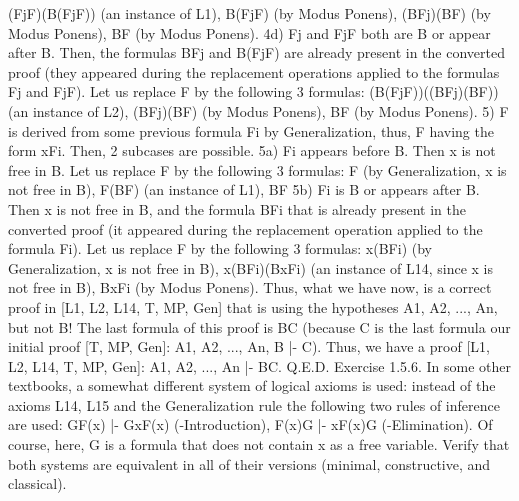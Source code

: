 (Fj\IMPLIES F)\IMPLIES (B\IMPLIES (Fj\IMPLIES F)) (an instance of L1),
B\IMPLIES (Fj\IMPLIES F) (by Modus Ponens),
(B\IMPLIES Fj)\IMPLIES (B\IMPLIES F) (by Modus Ponens),
B\IMPLIES F (by Modus Ponens).
4d) Fj and Fj\IMPLIES F both are B or appear after B. Then, the formulas B\IMPLIES Fj and B\IMPLIES (Fj\IMPLIES F) are already
present in the converted proof (they appeared during the replacement operations applied to the formulas
Fj and Fj\IMPLIES F). Let us replace F by the following 3 formulas:
(B\IMPLIES (Fj\IMPLIES F))\IMPLIES ((B\IMPLIES Fj)\IMPLIES (B\IMPLIES F)) (an instance of L2),
(B\IMPLIES Fj)\IMPLIES (B\IMPLIES F) (by Modus Ponens),
B\IMPLIES F (by Modus Ponens).
5) F is derived from some previous formula Fi by Generalization, thus, F having the form \forall xFi. Then, 2
subcases are possible.
5a) Fi appears before B. Then x is not free in B. Let us replace F by the following 3 formulas:
F (by Generalization, x is not free in B),
F\IMPLIES (B\IMPLIES F) (an instance of L1),
B\IMPLIES F
5b) Fi is B or appears after B. Then x is not free in B, and the formula B\IMPLIES Fi that is already present in the
converted proof (it appeared during the replacement operation applied to the formula Fi). Let us replace F
by the following 3 formulas:
\forall x(B\IMPLIES Fi) (by Generalization, x is not free in B),
\forall x(B\IMPLIES Fi)\IMPLIES (B\IMPLIES \forall xFi) (an instance of L14, since x is not free in B),
B\IMPLIES \forall xFi (by Modus Ponens).
Thus, what we have now, is a correct proof in [L1, L2, L14, T, MP, Gen] that is using the hypotheses A1,
A2, ..., An, but not B! The last formula of this proof is B\IMPLIES C (because C is the last formula our initial
proof [T, MP, Gen]: A1, A2, ..., An, B |- C). Thus, we have a proof [L1, L2, L14, T, MP, Gen]: A1, A2, ...,
An |- B\IMPLIES C. Q.E.D.
Exercise 1.5.6. In some other textbooks, a somewhat different system of logical axioms is used: instead
of the axioms L14, L15 and the Generalization rule the following two rules of inference are used:
G\IMPLIES F(x) |- G\IMPLIES \forall xF(x) (\forall -Introduction),
F(x)\IMPLIES G |- \exists xF(x)\IMPLIES G (\exists -Elimination).
Of course, here, G is a formula that does not contain x as a free variable. Verify that both systems are
equivalent in all of their versions (minimal, constructive, and classical).

